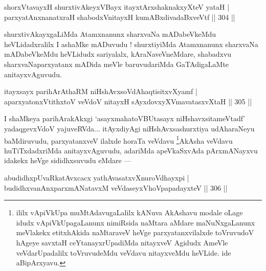 \begin{shl}
shorxVtavayxH shurxtivAkeyxVBayx itayxtArx\s \s shaknakxyXteV yataH |
parxyatAnxnanatxraH shabodxV\s nitayxH kumABxdivadaBxveVtf \hfill || 304 ||
\end{shl}

\begin{artha}
shurxtivAkayxgaLiMda Atamxnanunx sharxvaNa mADabeVkeMdu heVLidadxralilx I ashaMke mADuvudu ! shurxtiyiMda Atamxnanunx sharxvaNa mADabeVkeMdu heVLidudx sariyalalx, kAraNaveVneMdare, shabadxvu sharxvaNaparxyatanx mADida meVle baruvudariMda GaTAdigaLaMte anitayxvAguvudu.
\end{artha}

\begin{shl}
itayxsayx parihArAthaRM niHshAvxsoVdAhaqtisitxvXyamf |
aparxyatonxVtithxtoV veVdoV nitayxH sAyxdovxyXVmavatasxvXtaH \hfill || 305 ||
\end{shl}

\begin{artha}
I shaMkeya parihArakAkxgi `asayxmahatoVBUtasayx niHshavxsitameVtadf' yadaqgevxVdoV yajuveRVda... itAyxdiyAgi niHshAvxsashurxtiya udAharaNeyu baMdiruvudu, parxyatanxveV ilalxde horaTa veVdavu \footnote{ililx vApiVkUpa muMtAdavugaLalilx kANuva AkAshavu modale oLage idudx vApiVkUpagaLanunx nimiRsida naMtara aMdare maNuNxgaLanunx meVlakekx etitxhAkida naMtaraveV heVge parxyatanxvilalxde toVruvudoV hAgeye savxtaH ceYtanayxrUpadiMda nitayxveV Agidudx AmeVle veVdarUpadalilx toVruvudeMdu veVdavu nitayxveMdu heVLide. ide aBipArxyavu.}AkAsha veVdavu huTiTxdadxriMda anitayxvAguvudu, adariMda apeVkaSxvAda pArxmANayxvu idakekx heVge sididhxsuvudu  eMdare  {\rm ---} 
\end{artha}

\begin{shl}
abudidhxpUvaRkatAvxcacx yathAvasatxvXnuroVdhayxpi |
budidhxvanAnxparxmANatavxM veVdaseyxVhoVpapadayxteV \hfill || 306 ||
\end{shl}

